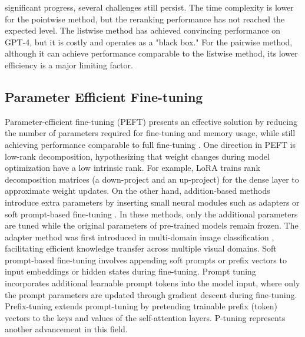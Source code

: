 \documentclass[sigconf,natbib=true,anonymous=false]{acmart}
\begin{document}
significant progress, several challenges still persist. The time complexity is lower for the pointwise method, but the reranking performance has not reached the expected level. The listwise method has achieved convincing performance on GPT-4, but it is costly and operates as a "black box." For the pairwise method, although it can achieve performance comparable to the listwise method, its lower efficiency is a major limiting factor.


\subsection{Parameter Efficient Fine-tuning}

Parameter-efficient fine-tuning (PEFT) presents an effective solution by reducing the number of parameters required for fine-tuning and memory usage, while still achieving performance comparable to full fine-tuning \cite{DBLP:journals/corr/abs-2312-12148}. One direction in PEFT is low-rank decomposition, hypothesizing that weight changes during model optimization have a low intrinsic rank. For example, LoRA \cite{DBLP:conf/iclr/HuSWALWWC22} trains rank decomposition matrices (a down-project and an up-project) for the dense layer to approximate weight updates. On the other hand, addition-based methods introduce extra parameters by inserting small neural modules such as adapters \cite{DBLP:conf/icml/HoulsbyGJMLGAG19} or soft prompt-based fine-tuning \cite{DBLP:conf/acl/LiL20, DBLP:journals/corr/abs-2103-10385, DBLP:conf/emnlp/LesterAC21}. In these methods, only the additional parameters are tuned while the original parameters of pre-trained models remain frozen. The adapter method was first introduced in multi-domain image classification \cite{DBLP:conf/nips/RebuffiBV17}, facilitating efficient knowledge transfer across multiple visual domains. Soft prompt-based fine-tuning involves appending soft prompts or prefix vectors to input embeddings or hidden states during fine-tuning. Prompt tuning \cite{DBLP:conf/emnlp/LesterAC21} incorporates additional learnable prompt tokens into the model input, where only the prompt parameters are updated through gradient descent during fine-tuning. Prefix-tuning \cite{DBLP:conf/acl/LiL20} extends prompt-tuning by pretending trainable prefix (token) vectors to the keys and values of the self-attention layers. P-tuning \cite{DBLP:journals/corr/abs-2103-10385} represents another advancement in this field.
\end{document}
